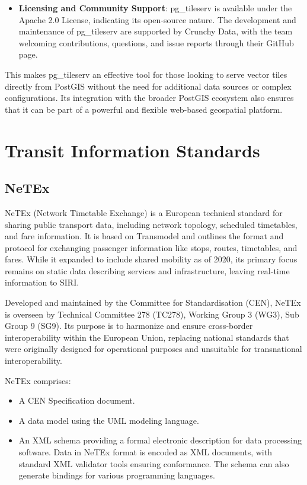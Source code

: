 \documentclass[12pt]{report}
\begin{document}
\begin{itemize}[noitemsep]
		\item \textbf{Licensing and Community Support}: pg\_tileserv is available under the Apache 2.0 License, indicating its open-source nature. The development and maintenance of pg\_tileserv are supported by Crunchy Data, with the team welcoming contributions, questions, and issue reports through their GitHub page.
	\end{itemize}
	
	This makes pg\_tileserv an effective tool for those looking to serve vector tiles directly from PostGIS without the need for additional data sources or complex configurations. Its integration with the broader PostGIS ecosystem also ensures that it can be part of a powerful and flexible web-based geospatial platform.
	
	\section{Transit Information Standards}
	
	\subsection{NeTEx}
	
	NeTEx (Network Timetable Exchange) is a European technical standard for sharing public transport data, including network topology, scheduled timetables, and fare information. It is based on Transmodel and outlines the format and protocol for exchanging passenger information like stops, routes, timetables, and fares. While it expanded to include shared mobility as of 2020, its primary focus remains on static data describing services and infrastructure, leaving real-time information to SIRI.
	
	Developed and maintained by the Committee for Standardisation (CEN), NeTEx is overseen by Technical Committee 278 (TC278), Working Group 3 (WG3), Sub Group 9 (SG9). Its purpose is to harmonize and ensure cross-border interoperability within the European Union, replacing national standards that were originally designed for operational purposes and unsuitable for transnational interoperability.
	
	NeTEx comprises:
	
	\begin{itemize}[noitemsep]
		\item A CEN Specification document.
		\item A data model using the UML modeling language.
		\item An XML schema providing a formal electronic description for data processing software. Data in NeTEx format is encoded as XML documents, with standard XML validator tools ensuring conformance. The schema can also generate bindings for various programming languages.
	\end{itemize}
	
\end{document}
